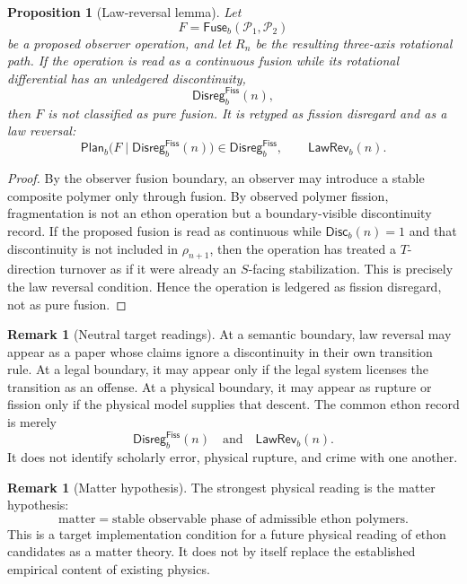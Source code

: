 \documentclass[11pt]{article}
\theoremstyle{definition}
\newtheorem{remark}[definition]{Remark}
\theoremstyle{plain}
\newtheorem{proposition}[definition]{Proposition}
\newcommand{\Fuse}{\mathsf{Fuse}}
\newcommand{\Fiss}{\mathsf{Fiss}}
\newcommand{\Plan}{\mathsf{Plan}}
\newcommand{\LawRev}{\mathsf{LawRev}}
\newcommand{\Disc}{\mathsf{Disc}}
\newcommand{\Disreg}{\mathsf{Disreg}}
\begin{document}
\begin{proposition}[Law-reversal lemma]
Let
\[
  F=\Fuse_b(\mathcal P_1,\mathcal P_2)
\]
be a proposed observer operation, and let \(R_n\) be the resulting
three-axis rotational path.  If the operation is read as a continuous
fusion while its rotational differential has an unledgered
discontinuity,
\[
  \Disreg_b^{\Fiss}(n),
\]
then \(F\) is not classified as pure fusion.  It is retyped as fission
disregard and as a law reversal:
\[
  \Plan_b\bigl(F\mid\Disreg_b^{\Fiss}(n)\bigr)
  \in
  \Disreg_b^{\Fiss},
  \qquad
  \LawRev_b(n).
\]
\end{proposition}

\begin{proof}
By the observer fusion boundary, an observer may introduce a stable
composite polymer only through fusion.  By observed polymer fission,
fragmentation is not an ethon operation but a boundary-visible
discontinuity record.  If the proposed fusion is read as continuous while
\(\Disc_b(n)=1\) and that discontinuity is not included in
\(\rho_{n+1}\), then the operation has treated a \(T\)-direction turnover
as if it were already an \(S\)-facing stabilization.  This is precisely
the law reversal condition.  Hence the operation is ledgered as fission
disregard, not as pure fusion.
\end{proof}

\begin{remark}[Neutral target readings]
At a semantic boundary, law reversal may appear as a paper whose claims
ignore a discontinuity in their own transition rule.  At a legal
boundary, it may appear only if the legal system licenses the transition
as an offense.  At a physical boundary, it may appear as rupture or
fission only if the physical model supplies that descent.  The common
ethon record is merely
\[
  \Disreg_b^{\Fiss}(n)
  \quad\text{and}\quad
  \LawRev_b(n).
\]
It does not identify scholarly error, physical rupture, and crime with
one another.
\end{remark}

\begin{remark}[Matter hypothesis]
The strongest physical reading is the matter hypothesis:
\[
  \text{matter}
  =
  \text{stable observable phase of admissible ethon polymers}.
\]
This is a target implementation condition for a future physical reading
of ethon candidates as a matter theory.  It does not by itself replace
the established empirical content of existing physics.
\end{remark}
\end{document}
